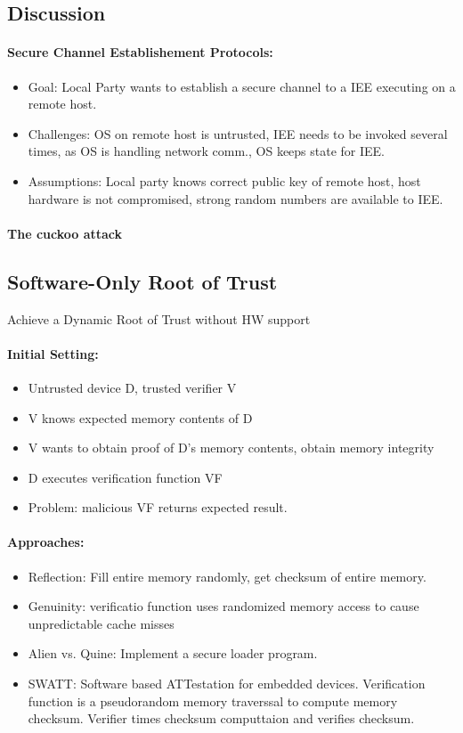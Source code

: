 \subsection{Discussion}
\paragraph{Secure Channel Establishement Protocols: }
\begin{itemize}
    \item Goal: Local Party wants to establish a secure channel to a IEE executing on a remote host. 
    \item Challenges: OS on remote host is untrusted, IEE needs to be invoked several times, as OS is handling network comm., OS keeps state for IEE.
    \item Assumptions: Local party knows correct public key of remote host, host hardware is not compromised, strong random numbers are available to IEE.
\end{itemize}{}

\paragraph{The cuckoo attack}

\subsection{Software-Only Root of Trust}
Achieve a Dynamic Root of Trust without HW support

\paragraph{Initial Setting:}
\begin{itemize}
    \item Untrusted device D, trusted verifier V
    \item V knows expected memory contents of D
    \item V wants to obtain proof of D's memory contents, obtain memory integrity
    \item D executes verification function VF
    \item Problem: malicious VF returns expected result.
\end{itemize}{}

\paragraph{Approaches:} 
\begin{itemize}
    \item Reflection: Fill entire memory randomly, get checksum of entire memory.
    \item Genuinity: verificatio function uses randomized memory access to cause unpredictable cache misses
    \item Alien vs. Quine: Implement a secure loader program.
    \item SWATT: Software based ATTestation for embedded devices. Verification function is a pseudorandom memory traverssal to compute memory checksum. Verifier times checksum computtaion and verifies checksum.
\end{itemize}{}

